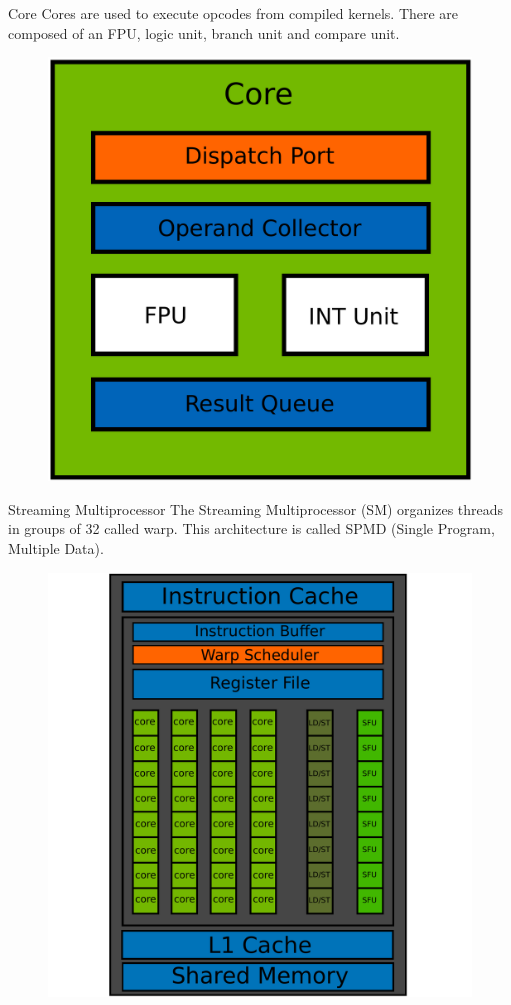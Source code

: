 \documentclass{beamer}
\begin{document}
\begin{frame}{Core}
	Cores are used to execute opcodes from compiled kernels. There are composed of an FPU, logic unit, branch unit and compare unit.
	\begin{figure}
		\includegraphics[scale=0.2]{figures/cudacore.pdf}
	\end{figure}
\end{frame}

\begin{frame}{Streaming Multiprocessor}
	The Streaming Multiprocessor (SM) organizes threads in groups of 32 called warp. This architecture is called SPMD (Single Program, Multiple Data).
	\begin{figure}
		\includegraphics[scale=0.3]{figures/warp.pdf}
	\end{figure}
\end{frame}
\end{document}
